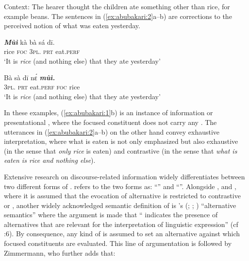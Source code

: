 \documentclass[output=paper,modfonts,nonflat,
\ChapterDOI{10.5281/zenodo.3367154}
 hidelinks
]{langsci/langscibook}
\begin{document}
Context: The hearer thought the children ate something other than rice, for example beans. The sentences in (\ref{ex:abubakari:2}a--b) are corrections to the perceived notion of what was eaten yesterday. 
 
 
\ea\label{ex:abubakari:2}
\ea\label{ex:abubakari:2a}
\gll \textbf{\textit{Mùì} }kà  bà  sá  dī.  \\ 
rice  \textsc{foc}  3\textsc{pl}.  \textsc{prt}  eat.\textsc{perf}   \\                  
\glt ‘It is \textit{rice} (and nothing else) that they ate yesterday’    

\ex\label{ex:abubakari:2b}
\gll Bà  sà  dī    nɛ́ \textbf{\textit{mùì.}}\\
3\textsc{pl}.  \textsc{prt}  eat.\textsc{perf}  \textsc{foc}  rice\\
\glt ‘It is \textit{rice} (and nothing else) that they ate yesterday’
\z
\z

In these examples, (\ref{ex:abubakari:1}b) is an instance of information or presentational , where the focused constituent does not carry any . The utterances in (\ref{ex:abubakari:2}a--b) on the other hand convey exhaustive interpretation, where what is eaten is not only emphasized but also exhaustive (in the sense that \textit{only rice} is eaten) and contrastive (in the sense that \textit{what is eaten is rice and nothing else}). 

Extensive research on discourse-related information widely differentiates between two different forms of  \citep{Halliday1967, chafe1976,szabolcsi1981,michael1986,ÉKiss1998,Vallduví1998,Molnár2002}. \citet{ÉKiss1998} refers to the two forms as: “” and  “”. Alongside \citet{ÉKiss1998}, \citet{Vallduví1998} and \citet{selkirk2008}, where it is assumed that the evocation of alternative is restricted to contrastive or , another widely acknowledged semantic definition of  is \citeauthor{rooth1985}’s (\citeyear{rooth1985}; \citeyear{Rooth1992}; \citeyear{rooth1996}) “alternative semantics” where the argument is made that “ indicates the presence of alternatives that are relevant for the interpretation of linguistic expression” (cf \citealt{krifka2007}:6).  By consequence, any kind of  is assumed to set an alternative against which focused constituents are evaluated. This line of argumentation is followed by Zimmermann, who further adds that: 
\end{document}
